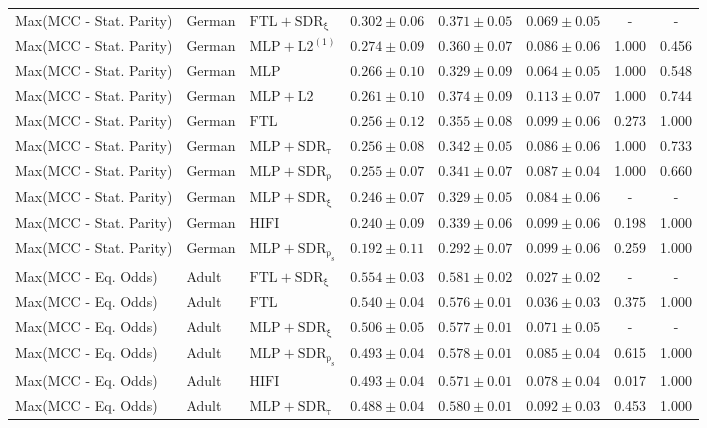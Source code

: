\begin{table}[htbp]
\begin{tabular}{lllccccc}
Max(MCC - Stat. Parity) & German & $\mathrm{FTL+SDR_{\xi}}$ & $0.302 \pm0.06$ & $0.371 \pm0.05$ & $0.069 \pm0.05$ & - & - \\
Max(MCC - Stat. Parity) & German & $\mathrm{MLP+L2^{(1)}}$ & $0.274 \pm0.09$ & $0.360 \pm0.07$ & $0.086 \pm0.06$ & 1.000 & 0.456 \\
Max(MCC - Stat. Parity) & German & $\mathrm{MLP}$ & $0.266 \pm0.10$ & $0.329 \pm0.09$ & $0.064 \pm0.05$ & 1.000 & 0.548 \\
Max(MCC - Stat. Parity) & German & $\mathrm{MLP+L2}$ & $0.261 \pm0.10$ & $0.374 \pm0.09$ & $0.113 \pm0.07$ & 1.000 & 0.744 \\
Max(MCC - Stat. Parity) & German & $\mathrm{FTL}$ & $0.256 \pm0.12$ & $0.355 \pm0.08$ & $0.099 \pm0.06$ & 0.273 & 1.000 \\
Max(MCC - Stat. Parity) & German & $\mathrm{MLP+SDR_{\tau}}$ & $0.256 \pm0.08$ & $0.342 \pm0.05$ & $0.086 \pm0.06$ & 1.000 & 0.733 \\
Max(MCC - Stat. Parity) & German & $\mathrm{MLP+SDR_{\rho}}$ & $0.255 \pm0.07$ & $0.341 \pm0.07$ & $0.087 \pm0.04$ & 1.000 & 0.660 \\
Max(MCC - Stat. Parity) & German & $\mathrm{MLP+SDR_{\xi}}$ & $0.246 \pm0.07$ & $0.329 \pm0.05$ & $0.084 \pm0.06$ & - & - \\
Max(MCC - Stat. Parity) & German & $\mathrm{HIFI}$ & $0.240 \pm0.09$ & $0.339 \pm0.06$ & $0.099 \pm0.06$ & 0.198 & 1.000 \\
Max(MCC - Stat. Parity) & German & $\mathrm{MLP+SDR_{\rho_s}}$ & $0.192 \pm0.11$ & $0.292 \pm0.07$ & $0.099 \pm0.06$ & 0.259 & 1.000 \\
\midrule
Max(MCC - Eq. Odds) & Adult & $\mathrm{FTL+SDR_{\xi}}$ & $0.554 \pm0.03$ & $0.581 \pm0.02$ & $0.027 \pm0.02$ & - & - \\
Max(MCC - Eq. Odds) & Adult & $\mathrm{FTL}$ & $0.540 \pm0.04$ & $0.576 \pm0.01$ & $0.036 \pm0.03$ & 0.375 & 1.000 \\
Max(MCC - Eq. Odds) & Adult & $\mathrm{MLP+SDR_{\xi}}$ & $0.506 \pm0.05$ & $0.577 \pm0.01$ & $0.071 \pm0.05$ & - & - \\
Max(MCC - Eq. Odds) & Adult & $\mathrm{MLP+SDR_{\rho_s}}$ & $0.493 \pm0.04$ & $0.578 \pm0.01$ & $0.085 \pm0.04$ & 0.615 & 1.000 \\
Max(MCC - Eq. Odds) & Adult & $\mathrm{HIFI}$ & $0.493 \pm0.04$ & $0.571 \pm0.01$ & $0.078 \pm0.04$ & 0.017 & 1.000 \\
Max(MCC - Eq. Odds) & Adult & $\mathrm{MLP+SDR_{\tau}}$ & $0.488 \pm0.04$ & $0.580 \pm0.01$ & $0.092 \pm0.03$ & 0.453 & 1.000 \\

\end{tabular}
\end{table}
